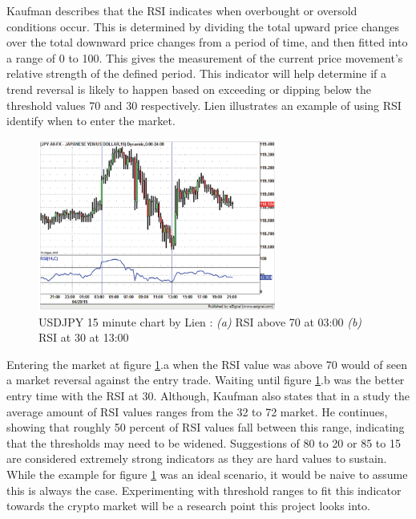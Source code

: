Kaufman \cite{BOOK:Kaufman:2013} describes that the RSI indicates when overbought or oversold conditions occur. This is determined by dividing the total upward price changes over the total downward price changes from a period of time, and then fitted into a range of 0 to 100. This gives the measurement of the current price movement's relative strength of the defined period. This indicator will help determine if a trend reversal is likely to happen based on exceeding or dipping below the threshold values 70 and 30 respectively. Lien \cite{BOOK:Lien:2016} illustrates an example of using RSI identify when to enter the market. 

\begin{figure}[htb]
    \centering
	\includegraphics[width=0.7\textwidth]{content/graphics/USDJPY-15_min_chart}
	\caption{USDJPY 15 minute chart by Lien \cite{BOOK:Lien:2016}: \textit{(a)} RSI above 70 at 03:00
	\textit{(b)} RSI at 30 at 13:00}
	\label{fig:related:USDJPY_15min}
\end{figure}

Entering the market at figure \ref{fig:related:USDJPY_15min}.a when the RSI value was above 70 would of seen a market reversal against the entry trade. Waiting until figure \ref{fig:related:USDJPY_15min}.b was the better entry time with the RSI at 30. Although, Kaufman also states that in a study the average amount of RSI values ranges from the 32 to 72 market. He continues, showing that roughly 50 percent of RSI values fall between this range, indicating that the thresholds may need to be widened. Suggestions of 80 to 20 or 85 to 15 are considered extremely strong indicators as they are hard values to sustain. While the example for figure \ref{fig:related:USDJPY_15min} was an ideal scenario, it would be naive to assume this is always the case. Experimenting with threshold ranges to fit this indicator towards the crypto market will be a research point this project looks into.

